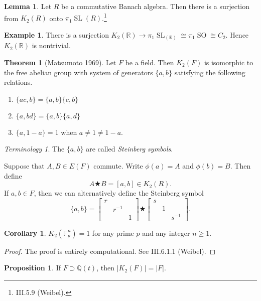 \documentclass[10pt,letterpaper,cm]{nupset}
\theoremstyle{definition}
\newtheorem{exmp}[definition]{Example}
\theoremstyle{theorem}
\newtheorem{theorem}[definition]{Theorem}
\newtheorem{lemma}[definition]{Lemma}
\newtheorem{corollary}[definition]{Corollary}
\newtheorem{prop}[definition]{Proposition}
\theoremstyle{remark}
\newtheorem*{term}{Terminology}
\newcommand{\F}{\mathbb F}
\newcommand{\Q}{\mathbb Q}
\newcommand{\R}{\mathbb R}
\newcommand{\1}{\mathbf{1}}
\newcommand{\0}{\vec 0}
\DeclareMathOperator*{\SL}{SL}
\DeclareMathOperator*{\SO}{SO}
\begin{document}
\begin{lemma}
Let $R$ be a commutative Banach algebra. Then there is a surjection from $K_2(R)$ onto $\pi_1\SL(R)$.\footnote{III.5.9 (Weibel).} 
\end{lemma}

\begin{exmp}
There is a surjection $K_2(\R) \to \pi_1 \SL_(\R) \cong \pi_1\SO \cong C_2$. Hence $K_2(\R)$ is nontrivial.
\end{exmp}

\begin{theorem}[Matsumoto 1969]
Let $F$ be a field. Then $K_2(F)$ is isomorphic to the free abelian group with system of generators $\{a, b\}$  satisfying the following relations.
\begin{enumerate}[label=(\roman*)]
\item $\{ac, b\} = \{a, b\}\{c, b\}$
\item $\{a, bd\} = \{a, b\}\{a, d\}$
\item $\{a, 1-a\}=1$ when $a \ne 1 \ne 1-a$.
\end{enumerate}
\end{theorem}

\begin{term}
The $\{a,b\}$ are called \textit{Steinberg symbols}.
\end{term}

\smallskip

Suppose that $A, B \in E(F)$ commute. Write $\phi(a) =A$ and $\phi(b) = B$. Then define $$A \bigstar B =[a,b] \in K_2(R).$$ If $a,b\in F$, then we can alternatively define the Steinberg symbol $$\{a, b\} = \begin{bmatrix}
    r & & \\
    & r^{{-1}} & \\
    & & 1
  \end{bmatrix}
 \bigstar
  \begin{bmatrix}
    s & & \\
    & 1 & \\
    & & s^{{-1}}
  \end{bmatrix}
 .$$

\begin{corollary}
$K_2(\F_p^n) =1$ for any prime $p$ and any integer $n\geq 1$.
\end{corollary}
\begin{proof}
The proof is entirely computational. See III.6.1.1 (Weibel).
\end{proof}

\begin{prop}
If $F \supset \Q(t)$, then $\left\lvert{K_2(F)}\right\rvert = \left\lvert{F}\right\rvert$.
\end{prop}
\end{document}
